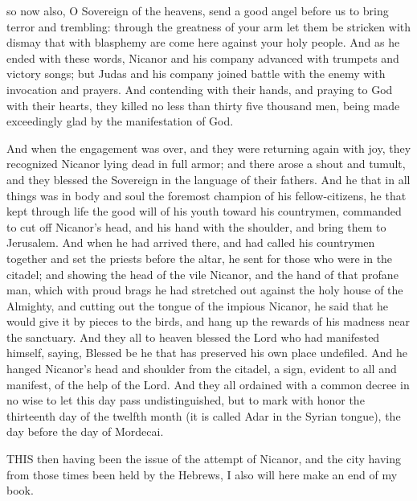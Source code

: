 {so now also, O Sovereign of the heavens, send a good angel before us to bring terror and trembling:
through the greatness of your arm let them be stricken with dismay that with blasphemy are come here against your holy people. And as he ended with these words,
Nicanor and his company advanced with trumpets and victory songs;
but Judas and his company joined battle with the enemy with invocation and prayers.
And contending with their hands, and praying to God with their hearts, they killed no less than thirty five thousand men, being made exceedingly glad by the manifestation of God.
\par }{\PP {}And when the engagement was over, and they were returning again with joy, they recognized Nicanor lying dead in full armor;
and there arose a shout and
 tumult, and
{} they blessed the Sovereign
{} in the language of their fathers.
And he that in all things was in body and soul the foremost champion of his fellow-citizens, he that kept through life the good will of his youth toward his countrymen, commanded to cut off Nicanor’s head, and his hand with the shoulder, and bring them to Jerusalem.
And when he had arrived there, and had called his countrymen together and set the priests before the altar, he sent for those who were in the citadel;
and showing the head of the vile Nicanor, and the hand of that profane man, which with proud brags he had stretched out against the holy house of the Almighty,
and cutting out the tongue of the impious Nicanor, he said that he would give
 it by pieces to the birds, and hang up the
 rewards of his madness near the sanctuary.
And they all
{} to heaven blessed
 the Lord who had manifested himself, saying, Blessed be he that has preserved his own place undefiled.
And he hanged Nicanor’s head and shoulder from the citadel, a sign, evident to all and manifest, of the help of the Lord.
And they all ordained with a common decree in no wise to let this day pass undistinguished, but to mark with honor the thirteenth day of the twelfth month (it is called Adar in the Syrian tongue), the day before the day of Mordecai.
\par }{\BB \par }{\PP {}THIS then having been the issue of the attempt of Nicanor, and the city having from those times been held by the Hebrews, I also will here make an end of my book.
}
